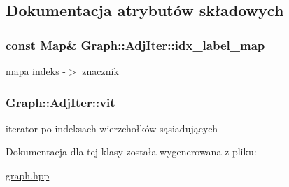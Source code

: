 \subsection{Dokumentacja atrybutów składowych}
\hypertarget{classGraph_1_1AdjIter_a1e4efc1aa5f449f16e1f8651bab11987}{
\subsubsection[{idx\-\_\-label\-\_\-map}]{\setlength{\rightskip}{0pt plus 5cm}const {\bf Map}\& Graph\-::\-Adj\-Iter\-::idx\-\_\-label\-\_\-map\hspace{0.3cm}{\ttfamily [private]}}}\label{classGraph_1_1AdjIter_a1e4efc1aa5f449f16e1f8651bab11987}


mapa indeks -\/$>$ znacznik 

\hypertarget{classGraph_1_1AdjIter_ad76d2b5dfade41f5c25cfc02e26dd6e7}{
\subsubsection[{vit}]{ Graph\-::\-Adj\-Iter\-::vit\hspace{0.3cm}{\ttfamily [private]}}}\label{classGraph_1_1AdjIter_ad76d2b5dfade41f5c25cfc02e26dd6e7}


iterator po indeksach wierzchołków sąsiadujących 



Dokumentacja dla tej klasy została wygenerowana z pliku\-:\begin{DoxyCompactItemize}
\item 
\hyperlink{graph_8hpp}{graph.\-hpp}\end{DoxyCompactItemize}
